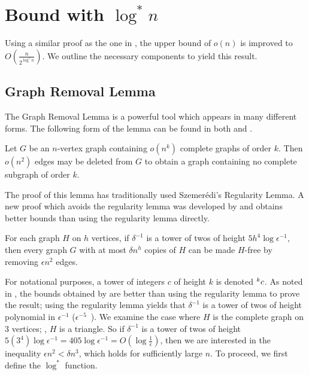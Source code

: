 \section{Bound with $\log^* n$}

Using a similar proof as the one in , the upper bound of $o(n)$ is improved to $O\left(\frac{n}{2^{\log^* n}}\right)$. We outline the necessary components to yield this result.

\subsection{Graph Removal Lemma}

The Graph Removal Lemma is a powerful tool which appears in many different forms. The following form of the lemma can be found in both \cite{Verstraete} and \cite{Fox11}.

\begin{lemma}\label{lem:removal-lemma}
	Let $G$ be an $n$-vertex graph containing $o(n^k)$ complete graphs of order $k$. Then $o(n^2)$ edges may be deleted from $G$ to obtain a graph containing no complete subgraph of order $k$.
\end{lemma}

The proof of this lemma has traditionally used Szemer\'edi's Regularity Lemma. A new proof which avoids the regularity lemma was developed by \cite{Fox11} and obtains better bounds than using the regularity lemma directly.

\begin{lemma}\label{lem:fox-removal-lemma}
	For each graph $H$ on $h$ vertices, if $\delta^{-1}$ is a tower of twos of height $5h^4\log \epsilon^{-1}$, then every graph $G$ with at most $\delta n^h$ copies of $H$ can be made $H$-free by removing $\epsilon n^2$ edges.
\end{lemma}

For notational purposes, a tower of integers $c$ of height $k$ is denoted $\prescript{k}{}{c}$. As noted in \cite{Fox11}, the bounds obtained by  are better than using the regularity lemma to prove the result; using the regularity lemma yields that $\delta^{-1}$ is a tower of twos of height polynomial in $\epsilon^{-1}$ ($\epsilon^{-5}$~\cite{Lee15}). We examine the case where $H$ is the complete graph on $3$ vertices; \ie, $H$ is a triangle. So if $\delta^{-1}$ is a tower of twos of height $5(3^4)\log \epsilon^{-1} = 405\log \epsilon^{-1} = O(\log \frac{1}{\epsilon})$, then we are interested in the inequality $\epsilon n^2 < \delta n^3$, which holds for sufficiently large $n$. To proceed, we first define the $\log^*$ function.

